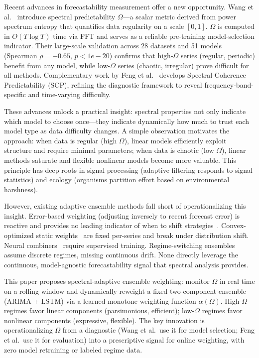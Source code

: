 \documentclass[11pt,letterpaper]{article}
\begin{document}
Recent advances in forecastability measurement offer a new opportunity. Wang et al.~\cite{Wang2025} introduce spectral predictability $\Omega$---a scalar metric derived from power spectrum entropy that quantifies data regularity on a scale $[0,1]$. $\Omega$ is computed in $O(T \log T)$ time via FFT and serves as a reliable pre-training model-selection indicator. Their large-scale validation across 28 datasets and 51 models (Spearman $\rho = -0.65$, $p < 1e-20$) confirms that high-$\Omega$ series (regular, periodic) benefit from any model, while low-$\Omega$ series (chaotic, irregular) prove difficult for all methods. Complementary work by Feng et al.~\cite{Feng2025} develops Spectral Coherence Predictability (SCP), refining the diagnostic framework to reveal frequency-band-specific and time-varying difficulty.

These advances unlock a practical insight: spectral properties not only indicate which model to choose once---they indicate dynamically how much to trust each model type as data difficulty changes. A simple observation motivates the approach: when data is regular (high $\Omega$), linear models efficiently exploit structure and require minimal parameters; when data is chaotic (low $\Omega$), linear methods saturate and flexible nonlinear models become more valuable. This principle has deep roots in signal processing (adaptive filtering responds to signal statistics) and ecology (organisms partition effort based on environmental harshness).

However, existing adaptive ensemble methods fall short of operationalizing this insight. Error-based weighting (adjusting inversely to recent forecast error) is reactive and provides no leading indicator of when to shift strategies~\cite{Sun2017}. Convex-optimized static weights~\cite{Vvra2026,Hammam2025} are fixed per-series and break under distribution shift. Neural combiners~\cite{Adhikari2015,Kourentzes2014} require supervised training. Regime-switching ensembles~\cite{Xu2025} assume discrete regimes, missing continuous drift. None directly leverage the continuous, model-agnostic forecastability signal that spectral analysis provides.

This paper proposes spectral-adaptive ensemble weighting: monitor $\Omega$ in real time on a rolling window and dynamically reweight a fixed two-component ensemble (ARIMA + LSTM) via a learned monotone weighting function $\alpha(\Omega)$. High-$\Omega$ regimes favor linear components (parsimonious, efficient); low-$\Omega$ regimes favor nonlinear components (expressive, flexible). The key innovation is operationalizing $\Omega$ from a diagnostic (Wang et al.~use it for model selection; Feng et al.~use it for evaluation) into a prescriptive signal for online weighting, with zero model retraining or labeled regime data.
\end{document}
